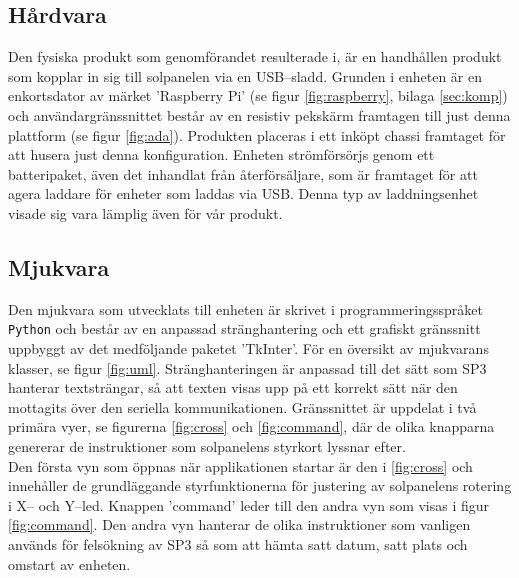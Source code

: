 \documentclass{article}
\begin{document}
        \subsection{Hårdvara} %
        \label{sub:h_rdvara}
        Den fysiska produkt som genomförandet resulterade i, är en handhållen produkt som kopplar in sig till sol\-panel\-en via en USB--sladd. Grunden i enheten är en enkorts\-dator av märket 'Raspberry Pi' (se figur \ref{fig:raspberry}, bilaga \ref{sec:komp}) och användargränssnittet består av en resistiv pekskärm framtagen till just denna plattform \cite{Ada} (se figur \ref{fig:ada}). Produkten placeras i ett inköpt chassi framtaget för att husera just denna konfiguration. Enheten strömförsörjs genom ett batteripaket, även det inhandlat från återförsäljare, som är framtaget för att agera laddare för enheter som laddas via USB. Denna typ av laddningsenhet visade sig vara lämplig även för vår produkt.

        \subsection{Mjukvara} %
        \label{sub:mjukvara}
         Den mjukvara som utvecklats till enheten är skrivet i programmeringsspråket \texttt{Python} och består av en anpassad stränghantering och ett grafiskt gränssnitt uppbyggt av det medföljande paketet 'TkInter'. För en översikt av mjukvarans klasser, se figur \ref{fig:uml}. Sträng\-hanteringen är anpassad till det sätt som SP3 hanterar textsträngar, så att texten visas upp på ett korrekt sätt när den mottagits över den seriella kommunikationen. Gränssnittet är uppdelat i två primära vyer, se figurerna \ref{fig:cross} och \ref{fig:command}, där de olika knapparna genererar de instruktioner som solpanelens styrkort lyssnar efter. \\

        \noindent Den första vyn som öppnas när applikationen startar är den i \ref{fig:cross} och innehåller de grund\-läggande styrfunktionerna för justering av solpanelens rotering i X-- och Y--led. Knappen 'command' leder till den andra vyn som visas i figur \ref{fig:command}. Den andra vyn hanterar de olika instruktioner som vanligen används för felsökning av SP3 så som att hämta satt datum, satt plats och omstart av enheten.
      
\end{document}
